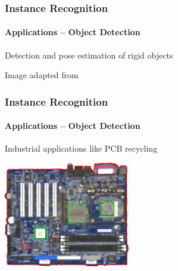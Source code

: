 \documentclass[xetex,professionalfont]{beamer}
\begin{document}

\begin{frame}
\frametitle{Instance Recognition}
\framesubtitle{Applications -- Object Detection}

Detection and pose estimation of rigid objects

\bigskip
\begin{center}
    {\centering Image adapted from \cite{lowe2004}}
\end{center}

\end{frame}


\begin{frame}
\frametitle{Instance Recognition}
\framesubtitle{Applications -- Object Detection}

Industrial applications like PCB recycling

\bigskip
\begin{center}
\includegraphics[width=5.5cm]{figures/reclaim-pcb.jpg}
\end{center}

\end{frame}

\end{document}
